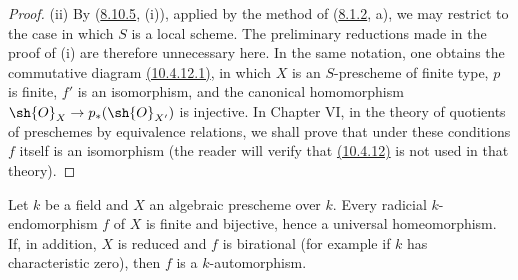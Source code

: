 \begin{proof}
\textup{(ii)} By ({\hyperlink{ega4.c04.thm.8-10-5}{8.10.5}}, (i)), applied by the method of ({\hyperlink{ega4.c04.statement.8-1-2}{8.1.2}}, a), we
may restrict to the case in which $S$ is a local scheme.  The preliminary
reductions made in the proof of (i) are therefore unnecessary here.  In
the same notation, one obtains the commutative diagram {\hyperlink{ega4.c04.sec.10-4-12-1}{(10.4.12.1)}}, in
which $X$ is an $S$-prescheme of finite type, $p$ is finite, $f'$ is an
isomorphism, and the canonical homomorphism
$\sh{O}_X\to p_*(\sh{O}_{X'})$ is injective.  In Chapter VI, in the
theory of quotients of preschemes by equivalence relations, we shall
prove that under these conditions $f$ itself is an isomorphism (the
reader will verify that {\hyperlink{ega4.c04.cor.10-4-12}{(10.4.12)}} is not used in that theory).
\end{proof}

\begin{corollary}[10.4.13]
\label{IV.10.4.13}
Let $k$ be a field and $X$ an algebraic prescheme over $k$.  Every
radicial $k$-endomorphism $f$ of $X$ is finite and bijective, hence a
universal homeomorphism.  If, in addition, $X$ is reduced and $f$ is
birational (for example if $k$ has characteristic zero), then $f$ is a
$k$-automorphism.
\end{corollary}

